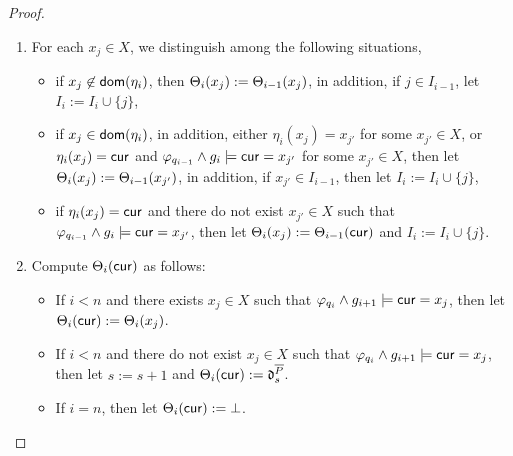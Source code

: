 \begin{appendix}
\begin{proof}
\begin{itemize}
\begin{enumerate}
\item For each $x_j \in X$, we distinguish among the following situations,
%
\begin{itemize}
\item if $x_j \not \in \mathsf{dom}(\eta_i)$, then $\Theta_i(x_j) := \Theta_{i-1}(x_j)$, in addition, if $j \in I_{i-1}$, let $I_i:=I_i \cup \{j\}$, 

\item  if $x_j \in \mathsf{dom}(\eta_i)$, in addition, either $\eta_i(x_j) = x_{j'}$ for some $x_{j'} \in X$, or $\eta_i(x_j) = \mathsf{cur}$ and $\varphi_{q_{i-1}} \wedge g_i \models \mathsf{cur} = x_{j'}$ for some $x_{j'} \in X$, then let $\Theta_i(x_j) := \Theta_{i-1}(x_{j'})$, in addition, if $x_{j'} \in I_{i-1}$,  then let $I_i := I_i \cup \{j\}$,

\item if $\eta_i(x_j) = \mathsf{cur}$ and there do not exist $x_{j'} \in X$ such that $\varphi_{q_{i-1}} \wedge g_i \models \mathsf{cur} = x_{j'}$, then let $\Theta_i(x_j):=\Theta_{i-1}(\mathsf{cur})$ and $I_i := I_i \cup \{j\}$. 
\end{itemize}
%
\item Compute $\Theta_i(\mathsf{cur})$ as follows:
\begin{itemize}
\item If $i< n$ and there exists $x_j \in X$ such that $\varphi_{q_i} \wedge g_{i+1} \models \mathsf{cur} = x_j$, then let $\Theta_i(\mathsf{cur}):=\Theta_{i}(x_{j})$.
%
\item If $i < n$ and there do not exist $x_j \in X$ such that $\varphi_{q_i} \wedge g_{i+1} \models \mathsf{cur} = x_j$, then let $s:=s+1$ and $\Theta_i(\mathsf{cur}) :=\mathfrak{d}^{\overline{P}}_s$. 

\item If $i = n$, then let $\Theta_i(\mathsf{cur}) := \bot$.
\end{itemize}


\end{enumerate}
\end{itemize}
\end{proof}
\end{appendix}
